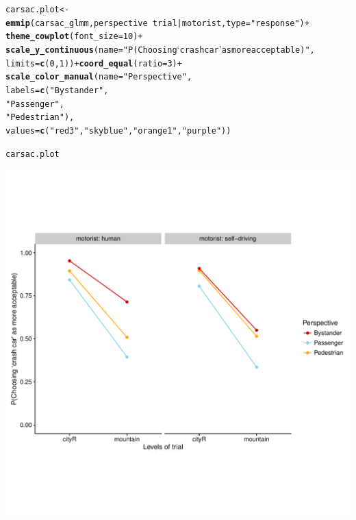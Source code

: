 \documentclass{scrartcl}\usepackage[]{graphicx}\usepackage[]{color}
\makeatletter
\def\maxwidth{ %
  \ifdim\Gin@nat@width>\linewidth
    \linewidth
  \else
    \Gin@nat@width
  \fi
}
\newcommand{\hlnum}[1]{\textcolor[rgb]{0.686,0.059,0.569}{#1}}%
\newcommand{\hlstr}[1]{\textcolor[rgb]{0.192,0.494,0.8}{#1}}%
\newcommand{\hlopt}[1]{\textcolor[rgb]{0,0,0}{#1}}%
\newcommand{\hlstd}[1]{\textcolor[rgb]{0.345,0.345,0.345}{#1}}%
\newcommand{\hlkwb}[1]{\textcolor[rgb]{0.69,0.353,0.396}{#1}}%
\newcommand{\hlkwc}[1]{\textcolor[rgb]{0.333,0.667,0.333}{#1}}%
\newcommand{\hlkwd}[1]{\textcolor[rgb]{0.737,0.353,0.396}{\textbf{#1}}}%
\newenvironment{kframe}{%
 \def\at@end@of@kframe{}%
 \ifinner\ifhmode%
  \def\at@end@of@kframe{\end{minipage}}%
  \begin{minipage}{\columnwidth}%
 \fi\fi%
 \def\FrameCommand##1{\hskip\@totalleftmargin \hskip-\fboxsep
 \colorbox{shadecolor}{##1}\hskip-\fboxsep
     \hskip-\linewidth \hskip-\@totalleftmargin \hskip\columnwidth}%
 \MakeFramed {\advance\hsize-\width
   \@totalleftmargin\z@ \linewidth\hsize
   \@setminipage}}%
 {\par\unskip\endMakeFramed%
 \at@end@of@kframe}
\newenvironment{knitrout}{}{} %
\makeatother
\begin{document}
\begin{knitrout}
\color{fgcolor}\begin{kframe}
\begin{alltt}
\hlstd{carsac.plot} \hlkwb{<-} \hlkwd{emmip}\hlstd{(carsac_glmm, perspective} \hlopt{~} \hlstd{trial} \hlopt{|} \hlstd{motorist,} \hlkwc{type} \hlstd{=} \hlstr{"response"}\hlstd{)} \hlopt{+}
    \hlkwd{theme_cowplot}\hlstd{(}\hlkwc{font_size} \hlstd{=} \hlnum{10}\hlstd{)} \hlopt{+}
    \hlkwd{scale_y_continuous}\hlstd{(}\hlkwc{name} \hlstd{=} \hlstr{"P(Choosing `crash car' as more acceptable)"}\hlstd{,}
                       \hlkwc{limits} \hlstd{=} \hlkwd{c}\hlstd{(}\hlnum{0}\hlstd{,} \hlnum{1}\hlstd{))} \hlopt{+} \hlkwd{coord_equal}\hlstd{(}\hlkwc{ratio} \hlstd{=} \hlnum{3}\hlstd{)} \hlopt{+}
    \hlkwd{scale_color_manual}\hlstd{(}\hlkwc{name} \hlstd{=} \hlstr{"Perspective"}\hlstd{,}
                       \hlkwc{labels} \hlstd{=} \hlkwd{c}\hlstd{(}\hlstr{"Bystander"}\hlstd{,}
                                  \hlstr{"Passenger"}\hlstd{,}
                                  \hlstr{"Pedestrian"}\hlstd{),}
                       \hlkwc{values} \hlstd{=} \hlkwd{c}\hlstd{(}\hlstr{"red3"}\hlstd{,} \hlstr{"skyblue"}\hlstd{,} \hlstr{"orange1"} \hlstd{,} \hlstr{"purple"}\hlstd{))}

\hlstd{carsac.plot}
\end{alltt}
\end{kframe}
\includegraphics[width=\maxwidth]{figure/carped-plot-1} 

\end{knitrout}
\end{document}
